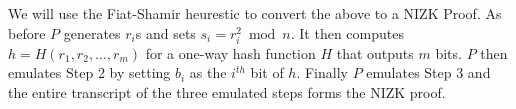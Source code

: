 \documentclass[]{report}   %
\begin{document}
We will use the Fiat-Shamir heurestic to convert the above to a NIZK Proof. As before $P$ generates $r_i$s and sets $s_i = r_i^2\bmod{n}$. It then computes $h = H(r_1, r_2, \ldots, r_m)$ for a one-way hash function $H$ that outputs $m$ bits. $P$ then emulates Step 2 by setting $b_i$ as the $i^{th}$ bit of $h$. Finally $P$ emulates Step 3 and the entire transcript of the three emulated steps forms the NIZK proof.
\end{document}

